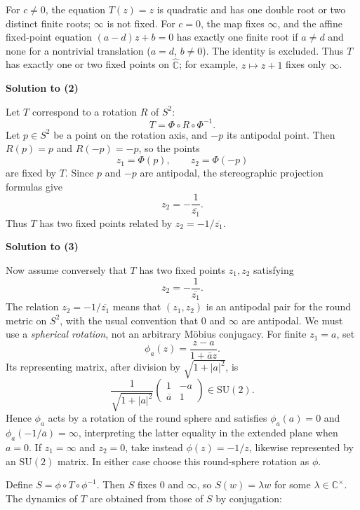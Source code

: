 \begin{solution}
For $c\ne0$, the equation $T(z)=z$ is quadratic and has
one double root or two distinct finite roots; $\infty$ is not fixed.
For $c=0$, the map fixes $\infty$, and the affine fixed-point equation
$(a-d)z+b=0$ has exactly one finite root if $a\ne d$ and none for a
nontrivial translation ($a=d$, $b\ne0$).  The identity is excluded.
Thus $T$ has exactly one or two fixed points on $\widehat{\mathbb C}$;
for example, $z\mapsto z+1$ fixes only $\infty$.

\par\medskip\noindent\textbf{Solution to (2)}\par\smallskip


Let $T$ correspond to a rotation $R$ of $S^{2}$:
\[
T = \Phi\circ R\circ\Phi^{-1}.
\]
Let $p\in S^{2}$ be a point on the rotation axis, and $-p$ its antipodal
point.  Then $R(p)=p$ and $R(-p)=-p$, so the points
\[
z_{1}=\Phi(p),\qquad z_{2}=\Phi(-p)
\]
are fixed by $T$.  Since $p$ and $-p$ are antipodal, the stereographic
projection formulas give
\[
z_{2} = -\frac{1}{\overline{z_{1}}}.
\]
Thus $T$ has two fixed points related by $z_{2}=-1/\overline{z_{1}}$.

\par\medskip\noindent\textbf{Solution to (3)}\par\smallskip


Now assume conversely that $T$ has two fixed points $z_{1},z_{2}$ satisfying
\[
z_{2} = -\frac{1}{\overline{z_{1}}}.
\]
The relation $z_{2}=-1/\overline{z_{1}}$ means that $(z_{1},z_{2})$
is an antipodal pair for the round metric on $S^{2}$, with the usual
convention that $0$ and $\infty$ are antipodal.  We must use a
\emph{spherical rotation}, not an arbitrary M\"obius conjugacy.
For finite $z_{1}=a$, set
\[
\phi_a(z)=\frac{z-a}{1+\overline a z}.
\]
Its representing matrix, after division by $\sqrt{1+|a|^2}$, is
\[
\frac{1}{\sqrt{1+|a|^2}}
\begin{pmatrix}1&-a\\ \overline a&1\end{pmatrix}\in\mathrm{SU}(2).
\]
Hence $\phi_a$ acts by a rotation of the round sphere and satisfies
$\phi_a(a)=0$ and $\phi_a(-1/\overline a)=\infty$,
interpreting the latter equality in the extended plane when $a=0$.
If $z_{1}=\infty$ and $z_{2}=0$, take instead
$\phi(z)=-1/z$, likewise represented by an $\mathrm{SU}(2)$ matrix.
In either case choose this round-sphere rotation as $\phi$.

Define $S = \phi\circ T\circ\phi^{-1}$.  Then $S$ fixes $0$ and $\infty$,
so $S(w)=\lambda w$ for some $\lambda\in\mathbb{C}^{\times}$.  The dynamics
of $T$ are obtained from those of $S$ by conjugation:


\end{solution}
